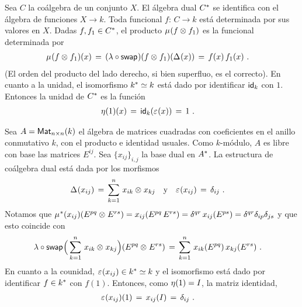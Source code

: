 \begin{ejemploAlgebraDual}\label{ejemplo:algebradual}
	Sea $C$ la co\'{a}lgebra de un conjunto $X$. El \'{a}lgebra dual
	$\dual C$ se identifica con el \'{a}lgebra de funciones
	$X\rightarrow k$. Toda funcional $f:\,C\rightarrow k$ est\'{a}
	determinada por sus valores en $X$. Dadas $f,f_1\in\dual C$, el
	producto $\producto(f\tensor f_1)$ es la funcional determinada por
	\begin{align*}
		\producto(f\tensor f_1) (x) & \,=\,
			(\lambda\circ\swap)(f\tensor f_1)(\coproducto(x)) \,=\,
			f(x)\,f_1(x)
		\text{ .}
	\end{align*}
	(El orden del producto del lado derecho, si bien superfluo, es el
	correcto). En cuanto a la unidad, el isomorfismo $\dual k\simeq k$
	est\'{a} dado por identificar $\id[k]$ con $1$. Entonces la unidad de
	$\dual C$ es la funci\'{o}n
	\begin{align*}
		\unidad(1)(x) & \,=\,\id[k](\counidad(x))\,=\,1
		\text{ .}
	\end{align*}
\end{ejemploAlgebraDual}

\begin{ejemploCoalgebraDualDeMatrices}\label{ejemplo:coalgebradualdematrices}
	Sea $A=\MM[n\times n](k)$ el \'{a}lgebra de matrices cuadradas con
	coeficientes en el anillo conmutativo $k$, con el producto e identidad
	usuales. Como $k$-m\'{o}dulo, $A$ es libre con base las matrices
	$E^{ij}$. Sea $\{x_{ij}\}_{i,j}$ la base dual en $\dual A$. La
	estructura de co\'{a}lgebra dual est\'{a} dada por los morfismos
	\begin{align*}
		\coproducto(x_{ij}) \,=\,\sum_{k=1}^n\,x_{ik}\tensor x_{kj}
			& \quad\text{y}\quad
		\counidad(x_{ij}) \,=\,\delta_{ij}
		\text{ .}
	\end{align*}
	Notamos que
	\begin{math}
		\dual\producto(x_{ij})(E^{pq}\tensor E^{rs})=
			x_{ij}(E^{pq}\,E^{rs})=\delta^{qr}\,x_{ij}(E^{ps})=
			\delta^{qr}\delta_{ip}\delta_{js}
	\end{math} y que esto coincide con
	\begin{align*}
		\lambda\circ\swap\Big(\sum_{k=1}^n\,x_{ik}\tensor x_{kj}\Big)
			(E^{pq}\tensor E^{rs}) & \,=\,
			\sum_{k=1}^n\,x_{ik}(E^{pq})\,x_{kj}(E^{rs})
		\text{ .}
	\end{align*}
	En cuanto a la counidad, $\counidad(x_{ij})\in \dual k\simeq k$ y el
	isomorfismo est\'{a} dado por identificar $f\in\dual k$ con $f(1)$.
	Entonces, como $\unidad(1)=I$, la matriz identidad,
	\begin{align*}
		\counidad(x_{ij})(1) & \,=\,x_{ij}(I) \,=\,\delta_{ij}
		\text{ .}
	\end{align*}
\end{ejemploCoalgebraDualDeMatrices}

